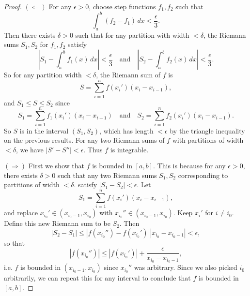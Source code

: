 \begin{proof}
  $(\Leftarrow)$ For any $\epsilon > 0$, choose
  step functions $f_1, f_2$ such that
  \[
    \int_a^b (f_2 - f_1)\, dx < \frac{\epsilon}{3}.
  \]
  Then there exists $\delta > 0$ such that for any
  partition with width $< \delta$, the Riemann
  sums $S_1, S_2$ for $f_1, f_2$ satisfy
  \[
    |S_1 - \int_a^b f_1(x)\, dx| < \frac{\epsilon}{3}
    \quad\text{and}\quad
    |S_2 - \int_a^b f_2(x)\, dx| < \frac{\epsilon}{3}.
  \]
  So for any partition width $< \delta$, the Riemann sum
  of $f$ is
  \[
    S = \sum_{i = 1}^n f(x_i') (x_i - x_{i - 1}),
  \]
  and $S_1 \le S \le S_2$ since
  \[
    S_1 = \sum_{i = 1}^n f_1(x_i') (x_i - x_{i - 1})
    \quad \text{and} \quad
    S_2 = \sum_{i = 1}^n f_2(x_i') (x_i - x_{i - 1}).
  \]
  So $S$ is in the interval $(S_1, S_2)$, which has
  length $< \epsilon$ by the triangle inequality on the
  previous results. For any two Riemann sums of
  $f$ with partitions of width $< \delta$, we have
  $|S' - S''| < \epsilon$. Thus $f$ is integrable.

  $(\Rightarrow)$ First we show that $f$ is bounded
  in $[a, b]$. This is because for any $\epsilon > 0$,
  there exists $\delta > 0$ such that any two Riemann
  sums $S_1, S_2$ corresponding to partitions of
  width $< \delta$.
  satisfy $|S_1 - S_2| < \epsilon$. Let
  \[
    S_1 = \sum_{i = 1}^n f(x_i') (x_i - x_{i - 1}),
  \]
  and replace $x_{i_0}' \in (x_{i_0 - 1}, x_{i_0})$
  with $x_{i_0}'' \in (x_{i_0 - 1}, x_{i_0})$. Keep
  $x_i'$ for $i \ne i_0$. Define this new Riemann sum
  to be $S_2$. Then
  \[
    |S_2 - S_1| \le |f(x_{i_0}'') - f(x_{i_0}')| |x_{i_0} - x_{i_0 - 1}|
    < \epsilon,
  \]
  so that
  \[
    |f(x_{i_0}'')| \le |f(x_{i_0}')| + \frac{\epsilon}{x_{i_0} - x_{i_0 - 1}},
  \]
  i.e. $f$ is bounded in $(x_{i_0 - 1}, x_{i_0})$ since
  $x_{i_0}''$ was arbitrary. Since we also picked $i_0$
  arbitrarily, we can repeat this for any
  interval to conclude that $f$ is bounded in $[a, b]$.


\end{proof}
